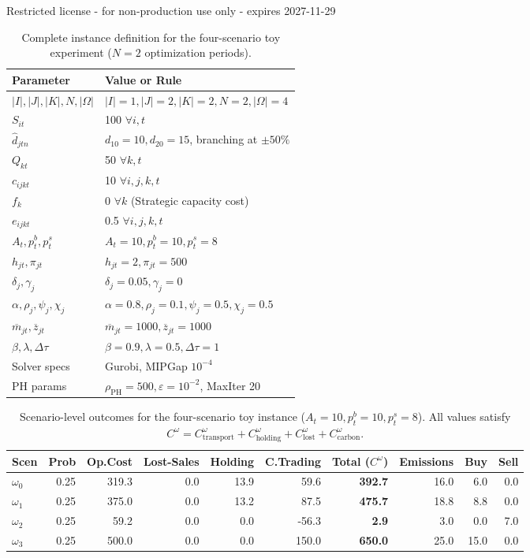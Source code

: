 Restricted license - for non-production use only - expires 2027-11-29
\begin{table}[ht]
\centering
\caption{Complete instance definition for the four-scenario toy experiment ($N=2$ optimization periods).}
\begin{tabular}{ll}
\toprule
\textbf{Parameter} & \textbf{Value or Rule} \\
\midrule
$|I|, |J|, |K|, N, |\Omega|$ & $|I|=1, |J|=2, |K|=2, N=2, |\Omega|=4$ \\
$S_{it}$ & 100 $\forall i, t$ \\
$\widehat{d}_{jtn}$ & $d_{10}=10, d_{20}=15$, branching at $\pm 50\%$ \\
$Q_{kt}$ & 50 $\forall k, t$ \\
$c_{ijkt}$ & 10 $\forall i, j, k, t$ \\
$f_k$ & 0 $\forall k$ (Strategic capacity cost) \\
$e_{ijkt}$ & 0.5 $\forall i, j, k, t$ \\
$A_t, p_t^b, p_t^s$ & $A_t=10, p_t^b=10, p_t^s=8$ \\
$h_{jt}, \pi_{jt}$ & $h_{jt}=2, \pi_{jt}=500$ \\
$\delta_j, \gamma_j$ & $\delta_j=0.05, \gamma_j=0$ \\
$\alpha, \rho_j, \psi_j, \chi_j$ & $\alpha=0.8, \rho_j=0.1, \psi_j=0.5, \chi_j=0.5$ \\
$\overline{m}_{jt}, \overline{z}_{jt}$ & $\overline{m}_{jt}=1000, \overline{z}_{jt}=1000$ \\
$\beta, \lambda, \Delta\tau$ & $\beta=0.9, \lambda=0.5, \Delta\tau=1$ \\
Solver specs & Gurobi, MIPGap $10^{-4}$ \\
PH params & $\rho_{\mathrm{PH}}=500, \varepsilon=10^{-2}$, MaxIter 20 \\
\bottomrule
\end{tabular}
\label{tab:instance_def}
\end{table}



\begin{table}[ht]
\centering
\caption{Scenario-level outcomes for the four-scenario toy instance ($A_t=10, p_t^b=10, p_t^s=8$). All values satisfy $C^\omega = C_{\mathrm{transport}}^\omega + C_{\mathrm{holding}}^\omega + C_{\mathrm{lost}}^\omega + C_{\mathrm{carbon}}^\omega$.}
\begin{tabular}{lrrrrrrrrr}
\toprule
Scen & Prob & Op.Cost & Lost-Sales & Holding & C.Trading & Total ($C^\omega$) & Emissions & Buy & Sell \\
\midrule
$\omega_0$ & 0.25 & 319.3 & 0.0 & 13.9 & 59.6 & \textbf{392.7} & 16.0 & 6.0 & 0.0 \\
$\omega_1$ & 0.25 & 375.0 & 0.0 & 13.2 & 87.5 & \textbf{475.7} & 18.8 & 8.8 & 0.0 \\
$\omega_2$ & 0.25 & 59.2 & 0.0 & 0.0 & -56.3 & \textbf{2.9} & 3.0 & 0.0 & 7.0 \\
$\omega_3$ & 0.25 & 500.0 & 0.0 & 0.0 & 150.0 & \textbf{650.0} & 25.0 & 15.0 & 0.0 \\
\bottomrule
\end{tabular}
\label{tab:scenarios}
\end{table}
